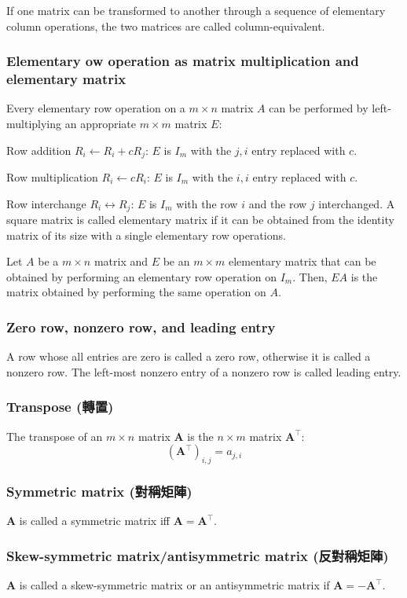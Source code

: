 \documentclass[a4paper,12pt]{report}
\begin{document}
If one matrix can be transformed to another through a sequence of elementary column operations, the two matrices are called column-equivalent.
\subsubsection{Elementary ow operation as matrix multiplication and elementary matrix}
Every elementary row operation on a $m\times n$ matrix $A$ can be performed by left-multiplying an appropriate $m\times m$ matrix $E$:
\bit
\item Row addition $R_i\leftarrow R_i+cR_j$: $E$ is $I_m$ with the $j,i$ entry replaced with $c$. 
\item Row multiplication $R_i\leftarrow cR_i$: $E$ is $I_m$ with the $i,i$ entry replaced with $c$. 
\item Row interchange $R_i\leftrightarrow R_j$: $E$ is $I_m$ with the row $i$ and the row $j$ interchanged.
\eit
A square matrix is called elementary matrix if it can be obtained from the identity matrix of its size with a single elementary row operations.

Let $A$ be a $m\times n$ matrix and $E$ be an $m\times m$ elementary matrix that can be obtained by performing an elementary row operation on $I_m$. Then, $EA$ is the matrix obtained by performing the same operation on $A$.
\subsubsection{Zero row, nonzero row, and leading entry}
A row whose all entries are zero is called a zero row, otherwise it is called a nonzero row. The left-most nonzero entry of a nonzero row is called leading entry.
\subsubsection{Transpose (轉置)}
The transpose of an $m\times n$ matrix $\mathbf{A}$ is the $n\times m$ matrix $\mathbf{A}^\top$:
\[(\mathbf{A}^\top)_{i,j}=a_{j,i}\]
\subsubsection{Symmetric matrix (對稱矩陣)}
$\mathbf{A}$ is called a symmetric matrix iff $\mathbf{A}=\mathbf{A}^\top$.
\subsubsection{Skew-symmetric matrix/antisymmetric matrix (反對稱矩陣)}
$\mathbf{A}$ is called a skew-symmetric matrix or an antisymmetric matrix if $\mathbf{A}=-\mathbf{A}^\top$.
\end{document}
